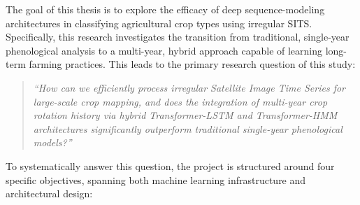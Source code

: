 The goal of this thesis is to explore the efficacy of deep sequence-modeling architectures in classifying agricultural crop types using
irregular SITS. Specifically, this research investigates the transition from traditional, single-year phenological analysis to a multi-year,
hybrid approach capable of learning long-term farming practices. This leads to the primary research question of this study:

\begin{quote}
\textit{``How can we efficiently process irregular Satellite Image Time Series for large-scale crop mapping,
    and does the integration of multi-year crop rotation history via hybrid Transformer-LSTM and
    Transformer-HMM architectures significantly outperform traditional single-year phenological models?''}
\end{quote}

To systematically answer this question, the project is structured around four specific objectives,
spanning both machine learning infrastructure and architectural design:

